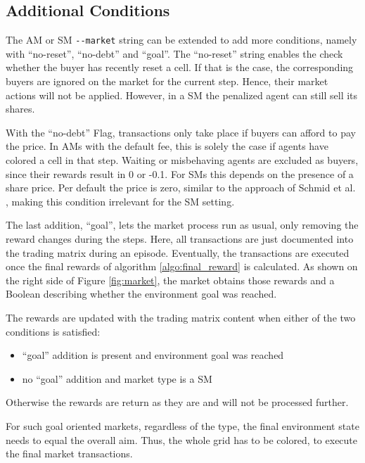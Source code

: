 \subsection{Additional Conditions}\label{market_conditions}
The AM or SM \verb|--market| string can be extended to add more conditions, namely with ``no-reset'', ``no-debt'' and ``goal''. The ``no-reset'' string enables the check whether the buyer has recently reset a cell. If that is the case, the corresponding buyers are ignored on the market for the current step. Hence, their market actions will not be applied. However, in a SM the penalized agent can still sell its shares. 

With the ``no-debt'' Flag, transactions only take place if buyers can afford to pay the price. In AMs with the default fee, this is solely the case if agents have colored a cell in that step. Waiting or misbehaving agents are excluded as buyers, since their rewards result in 0 or -0.1. For SMs this depends on the presence of a share price. Per default the price is zero, similar to the approach of Schmid et al. \cite{scbe21}, making this condition irrelevant for the SM setting.

The last addition, ``goal'', lets the market process run as usual, only removing the reward changes during the steps. Here, all transactions are just documented into the trading matrix during an episode. Eventually, the transactions are executed once the final rewards of algorithm \ref{algo:final_reward} is calculated. As shown on the right side of Figure \ref{fig:market}, the market obtains those rewards and a Boolean describing whether the environment goal was reached.

The rewards are updated with the trading matrix content when either of the two conditions is satisfied:
\begin{itemize}
    \item ``goal'' addition is present and environment goal was reached
    \item no ``goal'' addition and market type is a SM
\end{itemize}
Otherwise the rewards are return as they are and will not be processed further. 

For such goal oriented markets, regardless of the type, the final environment state needs to equal the overall aim. Thus, the whole grid has to be colored, to execute the final market transactions.

